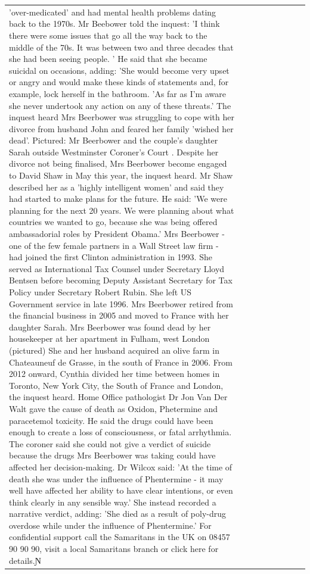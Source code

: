 \begin{table}[H]
\begin{tabular}{lllrlllll}
'over-medicated' and had mental health problems dating back to the 1970s. Mr Beebower told the inquest: 'I think there were some issues that go all the way back to the middle of the 70s. It was between two and three decades that she had been seeing people. ' He said that she became suicidal on occasions, adding: 'She would become very upset or angry and would make these kinds of statements and, for example, lock herself in the bathroom. 'As far as I'm aware she never undertook any action on any of these threats.' The inquest heard Mrs Beerbower was struggling to cope with her divorce from husband John and feared her family 'wished her dead'. Pictured: Mr Beerbower and the couple's daughter Sarah outside Westminster Coroner's Court . Despite her divorce not being finalised, Mrs Beerbower become engaged to David Shaw in May this year, the inquest heard. Mr Shaw described her as a 'highly intelligent women' and said they had started to make plans for the future. He said: 'We were planning for the next 20 years. We were planning about what countries we wanted to go, because she was being offered ambassadorial roles by President Obama.' Mrs Beerbower - one of the few female partners in a Wall Street law firm - had joined the first Clinton administration in 1993. She served as International Tax Counsel under Secretary Lloyd Bentsen before becoming Deputy Assistant Secretary for Tax Policy under Secretary Robert Rubin. She left US Government service in late 1996. Mrs Beerbower retired from the financial business in 2005 and moved to France with her daughter Sarah. Mrs Beerbower was found dead by her housekeeper at her apartment in Fulham, west London (pictured) She and her husband acquired an olive farm in Chateauneuf de Grasse, in the south of France in 2006. From 2012 onward, Cynthia divided her time between homes in Toronto, New York City, the South of France and London, the inquest heard. Home Office pathologist Dr Jon Van Der Walt gave the cause of death as Oxidon, Phetermine and paracetemol toxicity. He said the drugs could have been enough to create a loss of consciousness, or fatal arrhythmia. The coroner said she could not give a verdict of suicide because the drugs Mrs Beerbower was taking could have affected her decision-making. Dr Wilcox said: 'At the time of death she was under the influence of Phentermine - it may well have affected her ability to have clear intentions, or even think clearly in any sensible way.' She instead recorded a narrative verdict, adding: 'She died as a result of poly-drug overdose while under the influence of Phentermine.' For confidential support call the Samaritans in the UK on 08457 90 90 90, visit a local Samaritans branch or click here for details.Ɲ \\

\end{tabular}
\end{table}
